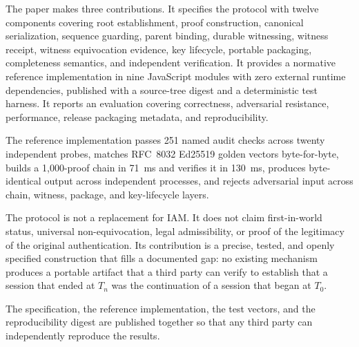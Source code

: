 \documentclass[11pt,a4paper]{article}
\begin{document}
The paper makes three contributions. It specifies the protocol with twelve components covering root establishment, proof construction, canonical serialization, sequence guarding, parent binding, durable witnessing, witness receipt, witness equivocation evidence, key lifecycle, portable packaging, completeness semantics, and independent verification. It provides a normative reference implementation in nine JavaScript modules with zero external runtime dependencies, published with a source-tree digest and a deterministic test harness. It reports an evaluation covering correctness, adversarial resistance, performance, release packaging metadata, and reproducibility.

The reference implementation passes 251 named audit checks across twenty independent probes, matches RFC~8032 Ed25519 golden vectors byte-for-byte, builds a 1{,}000-proof chain in 71~ms and verifies it in 130~ms, produces byte-identical output across independent processes, and rejects adversarial input across chain, witness, package, and key-lifecycle layers.

The protocol is not a replacement for IAM. It does not claim first-in-world status, universal non-equivocation, legal admissibility, or proof of the legitimacy of the original authentication. Its contribution is a precise, tested, and openly specified construction that fills a documented gap: no existing mechanism produces a portable artifact that a third party can verify to establish that a session that ended at $T_n$ was the continuation of a session that began at $T_0$.

The specification, the reference implementation, the test vectors, and the reproducibility digest are published together so that any third party can independently reproduce the results.
\end{document}
